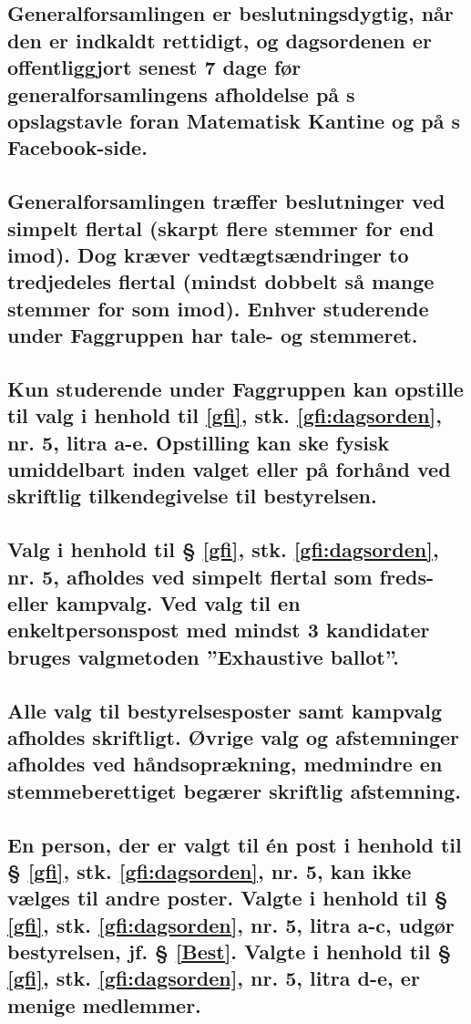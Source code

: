 \documentclass[10pt]{article}
\newcommand{\fagr}{\text{Fagrådet Sigma}}
\begin{document}
	\subsection{Generalforsamlingen er beslutningsdygtig, når den er indkaldt rettidigt, og dagsordenen er offentliggjort senest 7 dage før generalforsamlingens afholdelse på \fagr{}s opslagstavle foran Matematisk Kantine og på \fagr{}s Facebook-side.}\label{gf:rettid}
	
	\subsection{Generalforsamlingen træffer beslutninger ved simpelt flertal (skarpt flere stemmer for end imod). Dog kræver vedtægtsændringer to tredjedeles flertal (mindst dobbelt så mange stemmer for som imod). Enhver studerende under Faggruppen har tale- og stemmeret.}
	
	\subsection{Kun studerende under Faggruppen kan opstille til valg i henhold til \ref{gfi}, stk. \ref{gfi:dagsorden}, nr. 5, litra a-e. Opstilling kan ske fysisk umiddelbart inden valget eller på forhånd ved skriftlig tilkendegivelse til bestyrelsen.}\label{gf:studerende}
	
	\subsection{Valg i henhold til § \ref{gfi}, stk. \ref{gfi:dagsorden}, nr. 5, afholdes ved simpelt flertal som freds- eller kampvalg. Ved valg til en enkeltpersonspost med mindst 3 kandidater bruges valgmetoden ”Exhaustive ballot”.}\label{gf:menigtindvalgte}
	
	\subsection{Alle valg til bestyrelsesposter samt kampvalg afholdes skriftligt. Øvrige valg og afstemninger afholdes ved håndsoprækning, medmindre en stemmeberettiget begærer skriftlig afstemning.}\label{gf:bestyrelsesvalgte}
	
	\subsection{En person, der er valgt til én post i henhold til § \ref{gfi}, stk. \ref{gfi:dagsorden}, nr. 5, kan ikke vælges til andre poster. Valgte i henhold til § \ref{gfi}, stk. \ref{gfi:dagsorden}, nr. 5, litra a-c, udgør bestyrelsen, jf. § \ref{Best}. Valgte i henhold til § \ref{gfi}, stk. \ref{gfi:dagsorden}, nr. 5, litra d-e, er menige medlemmer.}\label{gf:begrpost}
	
\end{document}
